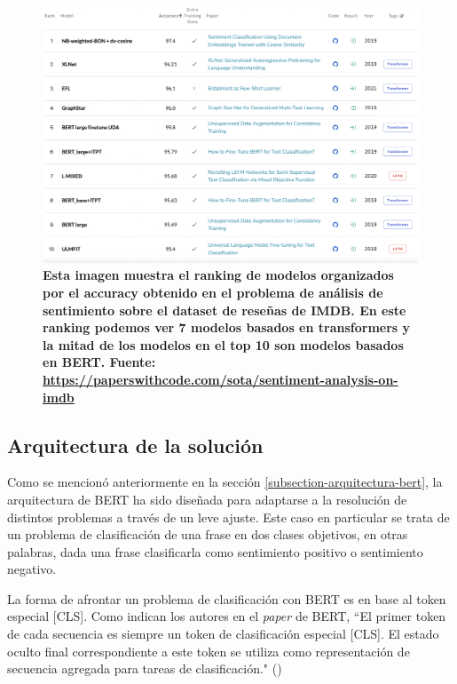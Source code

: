 \begin{figure}[ht!]
    \centering
    \includegraphics[scale=0.4]{figuras/as-eda-pwc-table.png}
    \caption[Análisis de Sentimiento - Papers with code - Top 10]{\textbf{Esta imagen muestra el ranking de modelos organizados por el accuracy obtenido en el problema de análisis de sentimiento sobre el dataset de reseñas de IMDB. En este ranking podemos ver 7 modelos basados en transformers y la mitad de los modelos en el top 10 son modelos basados en BERT. Fuente: \url{https://paperswithcode.com/sota/sentiment-analysis-on-imdb}}}
    \label{fig-as-eda-pwc-table}
\end{figure}


\subsection{Arquitectura de la solución}
\label{subsection-as-arquitectura-de-la-solucion}
Como se mencionó anteriormente en la sección \ref{subsection-arquitectura-bert}, la arquitectura de BERT ha sido diseñada para adaptarse a la resolución de distintos problemas a través de un leve ajuste. Este caso en particular se trata de un problema de clasificación de una frase en dos clases objetivos, en otras palabras, dada una frase clasificarla como sentimiento positivo o sentimiento negativo.

La forma de afrontar un problema de clasificación con BERT es en base al token especial [CLS]. Como indican los autores en el \textit{paper} de BERT, ``El primer token de cada secuencia es siempre un token de clasificación especial [CLS]. El estado oculto final correspondiente a este token se utiliza como representación de secuencia agregada para tareas de clasificación."  (\cite{https://doi.org/10.48550/arxiv.1810.04805})

